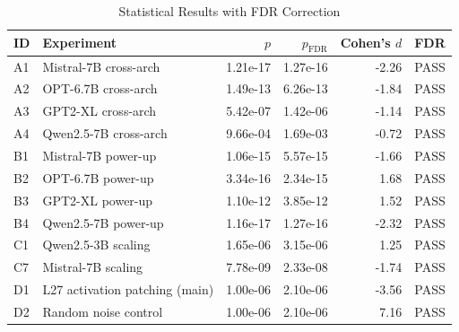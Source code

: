 \begin{table}[h]
\centering
\caption{Statistical Results with FDR Correction}
\label{tab:fdr_results}
\begin{tabular}{llrrrr}
\toprule
ID & Experiment & $p$ & $p_{\text{FDR}}$ & Cohen's $d$ & FDR \\
\midrule
A1 & Mistral-7B cross-arch & 1.21e-17 & 1.27e-16 & -2.26 & PASS \\
A2 & OPT-6.7B cross-arch & 1.49e-13 & 6.26e-13 & -1.84 & PASS \\
A3 & GPT2-XL cross-arch & 5.42e-07 & 1.42e-06 & -1.14 & PASS \\
A4 & Qwen2.5-7B cross-arch & 9.66e-04 & 1.69e-03 & -0.72 & PASS \\
B1 & Mistral-7B power-up & 1.06e-15 & 5.57e-15 & -1.66 & PASS \\
B2 & OPT-6.7B power-up & 3.34e-16 & 2.34e-15 & 1.68 & PASS \\
B3 & GPT2-XL power-up & 1.10e-12 & 3.85e-12 & 1.52 & PASS \\
B4 & Qwen2.5-7B power-up & 1.16e-17 & 1.27e-16 & -2.32 & PASS \\
C1 & Qwen2.5-3B scaling & 1.65e-06 & 3.15e-06 & 1.25 & PASS \\
C7 & Mistral-7B scaling & 7.78e-09 & 2.33e-08 & -1.74 & PASS \\
D1 & L27 activation patching (main) & 1.00e-06 & 2.10e-06 & -3.56 & PASS \\
D2 & Random noise control & 1.00e-06 & 2.10e-06 & 7.16 & PASS \\
\bottomrule
\end{tabular}
\end{table}
